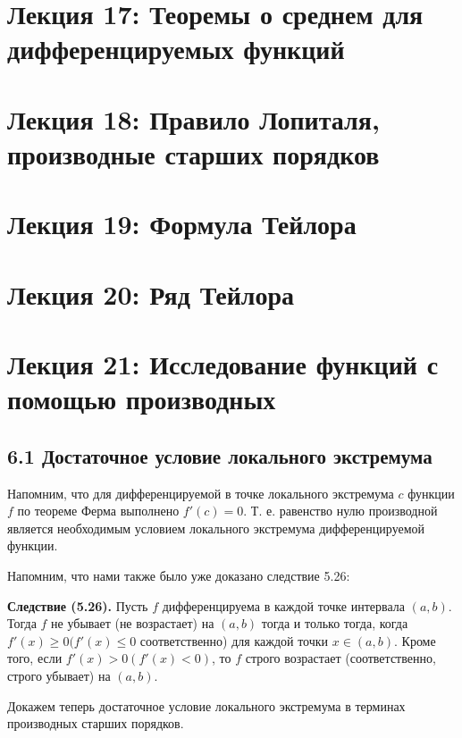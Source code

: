 	\newpage
	
	\section{Лекция 17: Теоремы о среднем для дифференцируемых функций}
	
	\newpage
	
	\section{Лекция 18: Правило Лопиталя, производные старших порядков}
	
	\newpage
	
	\section{Лекция 19: Формула Тейлора}
	
	\newpage
	
	\section{Лекция 20: Ряд Тейлора}
	
	\newpage
	
	\section{Лекция 21: Исследование функций с помощью производных}
	
	\subsection{6.1 Достаточное условие локального экстремума}
	
	Напомним, что для дифференцируемой в точке локального экстремума $c$ функции $f$ по теореме Ферма выполнено $f'(c) = 0$. Т. е. равенство нулю производной является необходимым условием локального экстремума дифференцируемой функции. 
	
	Напомним, что нами также было уже доказано следствие 5.26:
	
	\textbf{Следствие (5.26).} Пусть $f$ дифференцируема в каждой точке интервала $(a, b)$. Тогда $f$ не
	убывает (не возрастает) на $(a, b)$ тогда и только тогда, когда $f'(x) \geqslant 0 (f'(x) \leqslant 0$ соответственно) для каждой точки $x \in (a, b)$. Кроме того, если $f'(x) > 0 (f'(x) < 0)$, то $f$ строго возрастает (соответственно, строго убывает) на $(a, b)$.
	
	Докажем теперь достаточное условие локального экстремума в терминах производных старших порядков.
	
